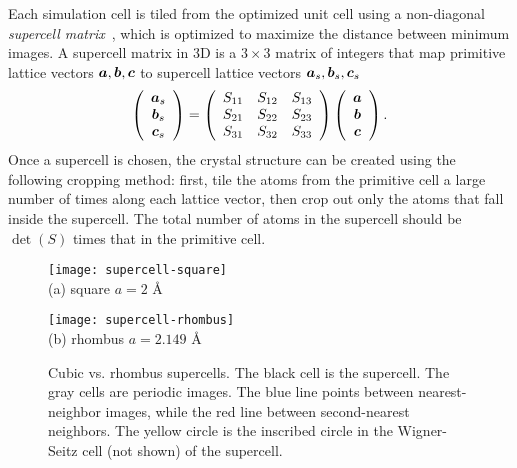 Each simulation cell is tiled from the optimized unit cell using a non-diagonal \emph{supercell matrix}~\cite{Lloyd-Williams2015}, which is optimized to maximize the distance between minimum images.
A supercell matrix in 3D is a $3\times 3$ matrix of integers that map primitive lattice vectors $\boldsymbol{a}, \boldsymbol{b}, \boldsymbol{c}$ to supercell lattice vectors  $\boldsymbol{a}_s, \boldsymbol{b}_s, \boldsymbol{c}_s$
\begin{align}
\left(\begin{array}{c}
\boldsymbol{a}_s \\
\boldsymbol{b}_s \\
\boldsymbol{c}_s
\end{array}\right) =
\left(\begin{array}{ccc}
S_{11} & S_{12} & S_{13} \\
S_{21} & S_{22} & S_{23} \\
S_{31} & S_{32} & S_{33}
\end{array}\right)
\left(\begin{array}{c}
\boldsymbol{a} \\
\boldsymbol{b} \\
\boldsymbol{c}
\end{array}\right).
\end{align}
Once a supercell is chosen, the crystal structure can be created using the following cropping method: first, tile the atoms from the primitive cell a large number of times along each lattice vector, then crop out only the atoms that fall inside the supercell.
The total number of atoms in the supercell should be $\det(S)$ times that in the primitive cell.

\begin{figure}[h]
	\centering
	\begin{minipage}{0.49\textwidth}
		\centering
		\texttt{[image: supercell-square]}\\
		(a) square $a=2$ \AA
	\end{minipage}
	\begin{minipage}{0.49\textwidth}
		\centering
		\texttt{[image: supercell-rhombus]}\\
		(b) rhombus $a=2.149$ \AA
	\end{minipage}
	\caption{Cubic vs. rhombus supercells. The black cell is the supercell. The gray cells are periodic images. The blue line points between nearest-neighbor images, while the red line between second-nearest neighbors. The yellow circle is the inscribed circle in the Wigner-Seitz cell (not shown) of the supercell.}
	\label{fig:hsolid-square-vs-rhombus}
\end{figure}

